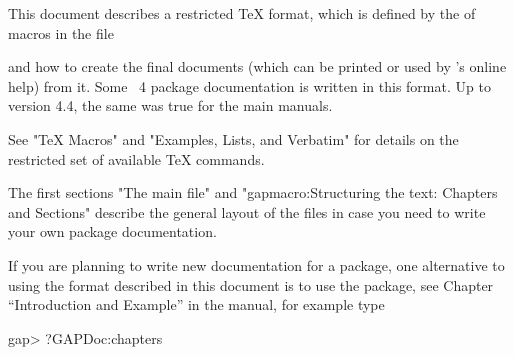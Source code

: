 
\OneColumnTableOfContents
\FrontMatter
%

\Chapters


This document describes a restricted {\TeX} format,
which is defined by the of macros in the file 


and how to create the final documents (which can be printed or used by
{\GAP}'s online help) from it.
Some {\GAP}~4 package documentation is written in this format.
Up to version 4.4, the same was true for the main {\GAP} manuals.

See "TeX Macros" and "Examples, Lists, and Verbatim" for details  on  the
restricted set of available {\TeX} commands.

The first sections "The main file" and
"gapmacro:Structuring the text: Chapters and Sections" describe
the  general  layout of the  files  in case  you need to   write your own
package documentation.

If you are planning to write new documentation for a {\GAP} package,
one alternative to using the format described in this document 
is to use the  package,
see Chapter ``Introduction and Example''
in the  manual,
for example type

\testexamplefalse
\beginexample
gap> ?GAPDoc:chapters
\endexample

